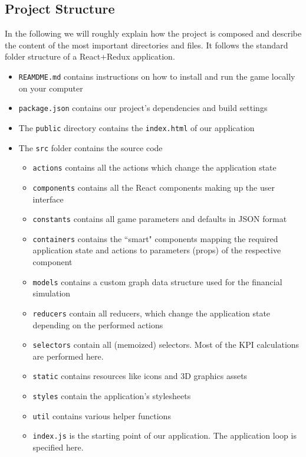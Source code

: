 \subsection{Project Structure}
In the following we will roughly explain how the project is composed and describe the content of the most important directories and files. It follows the standard folder structure of a React+Redux application.
\begin{itemize}
    \item \texttt{REAMDME.md} contains instructions on how to install and run the game locally on your computer
    \item \texttt{package.json} contains our project's dependencies and build settings
    \item The \texttt{public} directory contains the \texttt{index.html} of our application
    \item The \texttt{src} folder contains the source code
    \begin{itemize}
        \item \texttt{actions} contains all the actions which change the application state
        \item \texttt{components} contains all the React components making up the user interface
        \item \texttt{constants} contains all game parameters and defaults in JSON format
        \item \texttt{containers} contains the ``smart" components mapping the required application state and actions to parameters (props) of the respective component
        \item \texttt{models} contains a custom graph data structure used for the financial simulation
        \item \texttt{reducers} contain all reducers, which change the application state depending on the performed actions
        \item \texttt{selectors} contain all (memoized) selectors. Most of the KPI calculations are performed here.
        \item \texttt{static} contains resources like icons and 3D graphics assets
        \item \texttt{styles} contain the application's stylesheets
        \item \texttt{util} contains various helper functions
        \item \texttt{index.js} is the starting point of our application. The application loop is specified here.
    \end{itemize}
\end{itemize}

